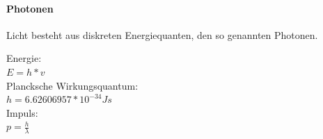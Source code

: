 \paragraph {Photonen}
Licht besteht aus diskreten Energiequanten, den so genannten Photonen.
\begin{multicols}{3}
Energie: \\ $E = h * v$ \\
Plancksche Wirkungsquantum: \\ $h = 6.62606957 * 10^{-34} Js$ \\
Impuls: \\ $p = \frac {h}{\lambda}$ 
\end{multicols}